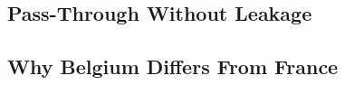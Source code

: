 %
%

\subsection{Pass-Through Without Leakage}\label{sec:discussion:joint}

%
%
%
%
%

\subsection{Why Belgium Differs From France}\label{sec:discussion:bevsfr}

%
%
%
%

